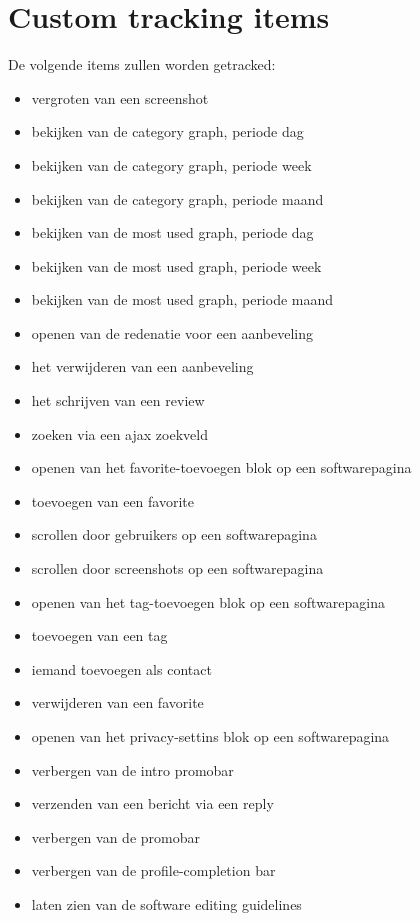\chapter{Custom tracking items}
    \label{customtrackingappendix}
     De volgende items zullen worden getracked:
     \begin{itemize}
     \item vergroten van een screenshot
     \item bekijken van de category graph, periode dag
     \item bekijken van de category graph, periode week
     \item bekijken van de category graph, periode maand
     \item bekijken van de most used graph, periode dag
     \item bekijken van de most used graph, periode week
     \item bekijken van de most used graph, periode maand
     \item openen van de redenatie voor een aanbeveling
     \item het verwijderen van een aanbeveling
     \item het schrijven van een review
     \item zoeken via een ajax zoekveld
     \item openen van het favorite-toevoegen blok op een softwarepagina
     \item toevoegen van een favorite
     \item scrollen door gebruikers op een softwarepagina
     \item scrollen door screenshots op een softwarepagina
     \item openen van het tag-toevoegen blok op een softwarepagina
     \item toevoegen van een tag
     \item iemand toevoegen als contact
     \item verwijderen van een favorite
     \item openen van het privacy-settins blok op een softwarepagina
     \item verbergen van de intro promobar
     \item verzenden van een bericht via een reply
     \item verbergen van de promobar
     \item verbergen van de profile-completion bar
     \item laten zien van de software editing guidelines
     \end{itemize}


